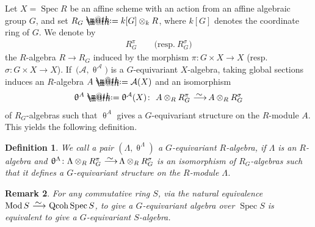 \documentclass[11pt]{article}
\makeatletter
\numberwithin{equation}{section}
\newtheorem{dfn}{Definition}[section]
\newtheorem{rem}[dfn]{Remark}
\newcommand*{\defeq}{\mathrel{\rlap{%
 \raisebox{0.3ex}{$\m@th\cdot$}}%
 \raisebox{-0.3ex}{$\m@th\cdot$}}%
 =}
\numberwithin{equation}{section}
\newcommand{\Spec}{\operatorname{Spec}}
\newcommand{\Qcoh}{\operatorname{Qcoh}}
\newcommand{\Mod}{\operatorname{Mod}}
\newcommand{\cA}{\mathcal{A}}
\newcommand{\simto}{\,\,\,\,\raisebox{4pt}{$\sim$}{\kern -1.1em \longrightarrow}\,}
\makeatother
\begin{document}
Let $X=\Spec R$ be an affine scheme with an action from an affine algebraic group $G$, and set $R_G\defeq k[G]\otimes_kR$, where $k[G]$ denotes the coordinate ring of $G$. We denote by
\begin{gather*}
R_G^{\pi}\qquad \big(\text{resp.}~R_G^{\sigma}\big)
\end{gather*}
the $R$-algebra $R\to R_G$ induced by the morphism $\pi\colon G\times X\to X$ (resp.\ $\sigma\colon G\times X\to X$).
If~$\big(\cA,\uptheta^{\cA}\big)$ is a $G$-equivariant $X$-algebra, taking global sections induces an $R$-algebra $A\defeq\cA(X)$ and an isomorphism
\begin{gather*}
\uptheta^{A}\defeq\uptheta^{\cA}(X)\colon\ A\otimes_R R_G^{\pi}\simto A\otimes_RR_G^{\sigma}
\end{gather*}
of $R_G$-algebras such that $\uptheta^{A}$ gives a $G$-equivariant structure on the $R$-module $A$. This yields the following definition.


 \begin{dfn}
 We call a pair
 $(\Lambda,\uptheta^{\Lambda})$
 a {\it $G$-equivariant $R$-algebra}, if $\Lambda$ is an $R$-algebra and $\uptheta^{\Lambda}\colon \Lambda\otimes_RR_G^{\pi}\simto\Lambda\otimes_RR_G^{\sigma}$ is an isomorphism of $R_G$-algebras such that it defines a $G$-equivariant structure on the $R$-module $\Lambda$.
 \end{dfn}

 \begin{rem}
For any commutative ring $S$, via the natural equivalence $\Mod S\simto \Qcoh \Spec S$, to give a $G$-equivariant algebra over $\Spec S$ is equivalent to give a $G$-equivariant $S$-algebra.
 \end{rem}
\end{document}
